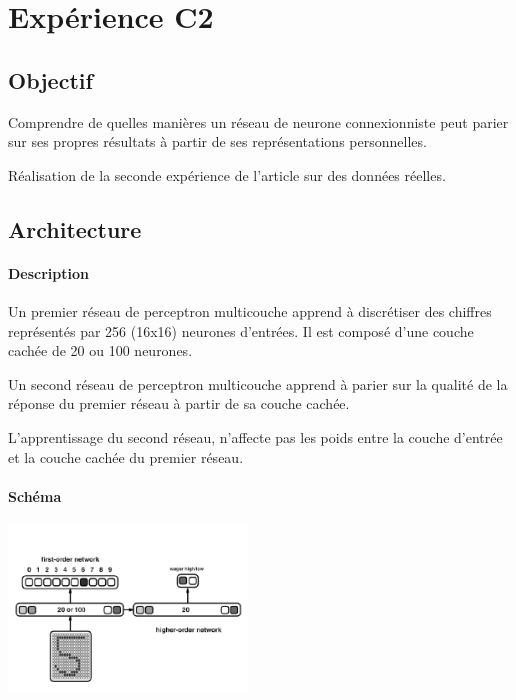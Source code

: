 \section{Expérience C2} \label{expC2}
  \subsection{Objectif}
    Comprendre de quelles manières un réseau de neurone connexionniste peut parier sur ses propres résultats
    à partir de ses représentations personnelles.

    
    Réalisation de la seconde expérience de l'article \cite{Cleeremans_2007} sur des données réelles.
  
  
  \subsection{Architecture}
    \paragraph{Description}
      Un premier réseau de perceptron multicouche apprend à discrétiser des chiffres représentés
      par 256 (16x16) neurones d'entrées. Il est composé d'une couche cachée de 20 ou 100 neurones.
      
      Un second réseau de perceptron multicouche apprend à parier sur la qualité de la réponse
      du premier réseau à partir de sa couche cachée.
      
      L'apprentissage du second réseau, n'affecte pas les poids entre la couche d'entrée et la 
      couche cachée du premier réseau.

    \paragraph{Schéma}
      \begin{center}
	\includegraphics[width=240px]{data/expC2/schema.png}
      \end{center}
      

